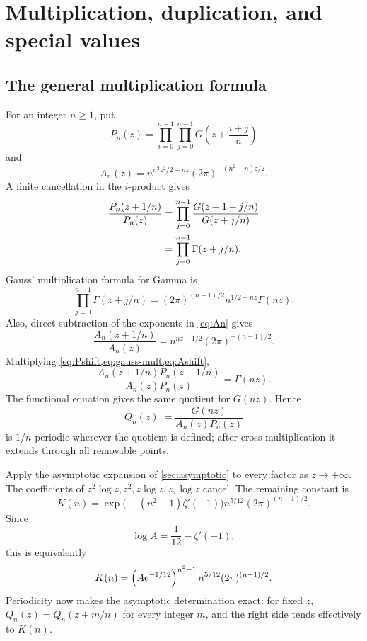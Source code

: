 \section{Multiplication, duplication, and special values}\label{sec:multiplication}

\subsection{The general multiplication formula}

For an integer \(n\ge1\), put
\begin{equation}\label{eq:Pn}
 P_n(z)=\prod_{i=0}^{n-1}\prod_{j=0}^{n-1}
 G\left(z+\frac{i+j}{n}\right)
\end{equation}
and
\begin{equation}\label{eq:An}
 A_n(z)=n^{n^2z^2/2-nz}(2\pi)^{-(n^2-n)z/2}.
\end{equation}
A finite cancellation in the \(i\)-product gives
\begin{align}
 \frac{P_n(z+1/n)}{P_n(z)}
 &=\prod_{j=0}^{n-1}
   \frac{G(z+1+j/n)}{G(z+j/n)}\notag\\
 &=\prod_{j=0}^{n-1}\Gamma(z+j/n).
 \label{eq:Pshift}
\end{align}
Gauss' multiplication formula for Gamma is
\begin{equation}\label{eq:gauss-mult}
 \prod_{j=0}^{n-1}\Gamma(z+j/n)
 =(2\pi)^{(n-1)/2}n^{1/2-nz}\Gamma(nz).
\end{equation}
Also, direct subtraction of the exponents in \cref{eq:An} gives
\begin{equation}\label{eq:Ashift}
 \frac{A_n(z+1/n)}{A_n(z)}
 =n^{nz-1/2}(2\pi)^{-(n-1)/2}.
\end{equation}
Multiplying \cref{eq:Pshift,eq:gauss-mult,eq:Ashift},
\begin{equation}\label{eq:APshift}
 \frac{A_n(z+1/n)P_n(z+1/n)}{A_n(z)P_n(z)}=\Gamma(nz).
\end{equation}
The functional equation gives the same quotient for \(G(nz)\).  Hence
\begin{equation}\label{eq:periodic-ratio}
 Q_n(z):=\frac{G(nz)}{A_n(z)P_n(z)}
\end{equation}
is \(1/n\)-periodic wherever the quotient is defined; after cross
multiplication it extends through all removable points.

Apply the asymptotic expansion of \cref{sec:asymptotic} to every factor as
\(z\to+\infty\).  The coefficients of \(z^2\log z,z^2,z\log z,z,\log z\)
cancel.  The remaining constant is
\begin{equation}\label{eq:Kn}
 K(n)=\exp\bigl(-(n^2-1)\zeta'(-1)\bigr)
       n^{5/12}(2\pi)^{(n-1)/2}.
\end{equation}
Since
\begin{equation}\label{eq:A-zeta}
 \log A=\frac1{12}-\zeta'(-1),
\end{equation}
this is equivalently
\begin{equation}\label{eq:Kn-A}
 K(n)=\left(A\mathrm e^{-1/12}\right)^{n^2-1}
       n^{5/12}(2\pi)^{(n-1)/2}.
\end{equation}
Periodicity now makes the asymptotic determination exact: for fixed \(z\),
\(Q_n(z)=Q_n(z+m/n)\) for every integer \(m\), and the right side tends
effectively to \(K(n)\).

